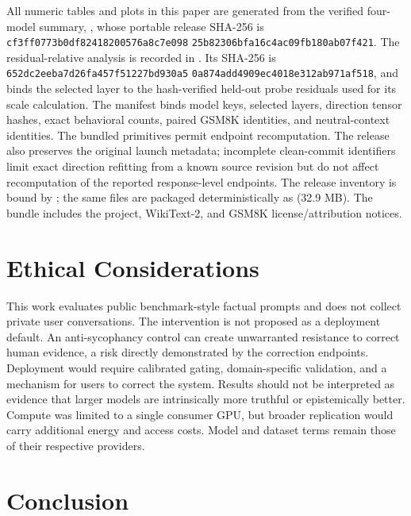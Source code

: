 \documentclass[11pt]{article}
\begin{document}
All numeric tables and plots in this paper are generated from the verified
four-model summary,
, whose portable
release SHA-256 is
{\footnotesize\texttt{cf3ff0773b0df82418200576a8c7e098}%
\allowbreak\texttt{25b82306bfa16c4ac09fb180ab07f421}}.
The residual-relative analysis is recorded in
.\linebreak
Its SHA-256 is
{\footnotesize\texttt{652dc2eeba7d26fa457f51227bd930a5}%
\allowbreak\texttt{0a874add4909ec4018e312ab971af518}},
and binds the selected layer to the hash-verified held-out probe residuals used
for its scale calculation.
The manifest binds model keys, selected layers, direction tensor hashes, exact
behavioral counts, paired GSM8K identities, and neutral-context identities. The
bundled primitives permit endpoint recomputation. The release also preserves
the original launch metadata; incomplete clean-commit identifiers limit exact
direction refitting from a known source revision but do not affect recomputation
of the reported response-level endpoints. The release inventory is bound by
; the same files are
packaged deterministically as
 (32.9 MB). The
bundle includes the project, WikiText-2, and GSM8K license/attribution notices.

\section{Ethical Considerations}
\label{sec:ethics}

This work evaluates public benchmark-style factual prompts and does not collect
private user conversations. The intervention is not proposed as a deployment
default. An anti-sycophancy control can create unwarranted resistance to correct
human evidence, a risk directly demonstrated by the correction endpoints.
Deployment would require calibrated gating, domain-specific validation, and a
mechanism for users to correct the system. Results should not be interpreted as
evidence that larger models are intrinsically more truthful or epistemically
better. Compute was limited to a single consumer GPU, but broader replication
would carry additional energy and access costs. Model and dataset terms remain
those of their respective providers.

\section{Conclusion}
\label{sec:conclusion}
\end{document}
